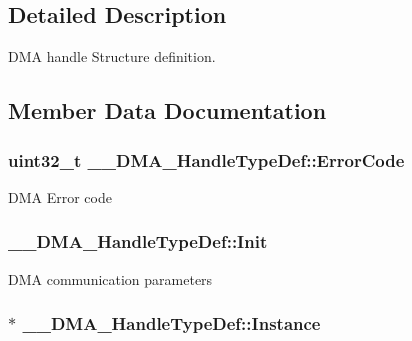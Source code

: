 \subsection{Detailed Description}
D\-M\-A handle Structure definition. 

\subsection{Member Data Documentation}
\hypertarget{struct_____d_m_a___handle_type_def_a67a2a8b907bc9b5c0af87f9de2bffc29}{
\subsubsection[{Error\-Code}]{ uint32\-\_\-t \-\_\-\-\_\-\-D\-M\-A\-\_\-\-Handle\-Type\-Def\-::\-Error\-Code}}\label{struct_____d_m_a___handle_type_def_a67a2a8b907bc9b5c0af87f9de2bffc29}
D\-M\-A Error code \hypertarget{struct_____d_m_a___handle_type_def_a3792cb34cedb0e2ab204e41b53ef75ad}{
\subsubsection[{Init}]{ \-\_\-\-\_\-\-D\-M\-A\-\_\-\-Handle\-Type\-Def\-::\-Init}}\label{struct_____d_m_a___handle_type_def_a3792cb34cedb0e2ab204e41b53ef75ad}
D\-M\-A communication parameters \hypertarget{struct_____d_m_a___handle_type_def_a9368ced5769abb92a56886ff879a7f5e}{
\subsubsection[{Instance}]{$\ast$ \-\_\-\-\_\-\-D\-M\-A\-\_\-\-Handle\-Type\-Def\-::\-Instance}}\label{struct_____d_m_a___handle_type_def_a9368ced5769abb92a56886ff879a7f5e}

